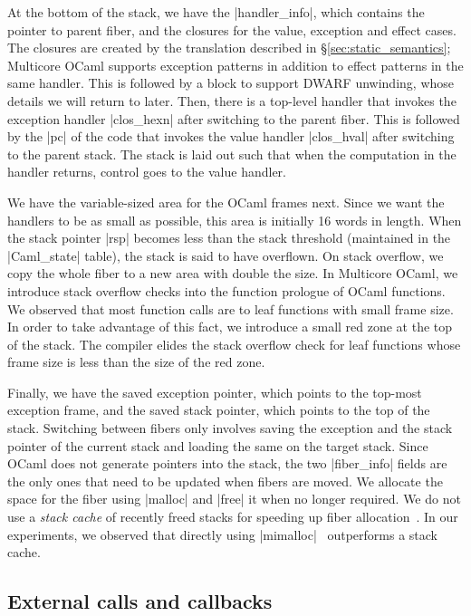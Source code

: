 \documentclass[sigplan,10pt,review,anonymous]{acmart}\settopmatter{printfolios=true,printccs=false,printacmref=false}
\begin{document}
At the bottom of the stack, we have the |handler_info|, which contains the
pointer to parent fiber, and the closures for the value, exception and effect
cases. The closures are created by the translation described in
\S\ref{sec:static_semantics}; Multicore OCaml supports exception patterns in
addition to effect patterns in the same handler. This is followed by a block to
support DWARF unwinding, whose details we will return to later. Then, there is
a top-level handler that invokes the exception handler |clos_hexn|
after switching to the parent fiber. This is followed by the |pc| of the code
that invokes the value handler |clos_hval| after switching to the parent stack. The
stack is laid out such that when the computation in the handler returns,
control goes to the value handler.

We have the variable-sized area for the OCaml frames next. Since we want the
handlers to be as small as possible, this area is initially 16 words in length.
When the stack pointer |rsp| becomes less than the stack threshold (maintained in the
|Caml_state| table), the stack is said to have overflown. On stack overflow, we
copy the whole fiber to a new area with double the size. In Multicore OCaml, we
introduce stack overflow checks into the function prologue of OCaml functions.
We observed that most function calls are to leaf functions with small frame
size. In order to take advantage of this fact, we introduce a small red zone at
the top of the stack. The compiler elides the stack overflow check for leaf
functions whose frame size is less than the size of the red zone.

Finally, we have the saved exception pointer, which points to the top-most
exception frame, and the saved stack pointer, which points to the top of the
stack. Switching between fibers only involves saving the exception and the
stack pointer of the current stack and loading the same on the target stack.
Since OCaml does not generate pointers into the stack, the two |fiber_info|
fields are the only ones that need to be updated when fibers are moved. We
allocate the space for the fiber using |malloc| and |free| it when no longer
required. We do not use a \emph{stack cache} of recently freed stacks for
speeding up fiber allocation~\cite{Farvardin20}. In our experiments, we
observed that directly using |mimalloc|~\cite{Leijen19} outperforms a stack
cache.

\vspace{-3mm}
\subsection{External calls and callbacks}
\end{document}
